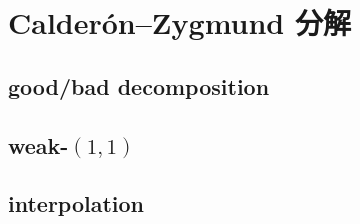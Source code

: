 \section{Calderón–Zygmund 分解}
\label{b2:sec:1802}


\subsection{good/bad decomposition}
\label{b2:subsec:180201}

\subsection{weak-\texorpdfstring{\((1,1)\)}{(1,1)}}
\label{b2:subsec:180202}

\subsection{interpolation}
\label{b2:subsec:180203}


